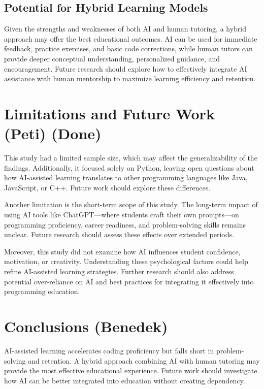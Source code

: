 \documentclass[12pt]{article}  %
\begin{document}
\subsection{Potential for Hybrid Learning Models}
Given the strengths and weaknesses of both AI and human tutoring, a hybrid approach may offer the best educational outcomes. AI can be used for immediate feedback, practice exercises, and basic code corrections, while human tutors can provide deeper conceptual understanding, personalized guidance, and encouragement. Future research should explore how to effectively integrate AI assistance with human mentorship to maximize learning efficiency and retention.



\section{Limitations and Future Work (Peti) (Done)}

This study had a limited sample size, which may affect the generalizability of the findings. Additionally, it focused solely on Python, leaving open questions about how AI-assisted learning translates to other programming languages like Java, JavaScript, or C++. Future work should explore these differences.

Another limitation is the short-term scope of this study. The long-term impact of using AI tools like ChatGPT—where students craft their own prompts—on programming proficiency, career readiness, and problem-solving skills remains unclear. Future research should assess these effects over extended periods.

Moreover, this study did not examine how AI influences student confidence, motivation, or creativity. Understanding these psychological factors could help refine AI-assisted learning strategies. Further research should also address potential over-reliance on AI and best practices for integrating it effectively into programming education.


\section{Conclusions (Benedek)}

AI-assisted learning accelerates coding proficiency but falls short in problem-solving and retention. A hybrid approach combining AI with human tutoring may provide the most effective educational experience. Future work should investigate how AI can be better integrated into education without creating dependency.



\end{document}
